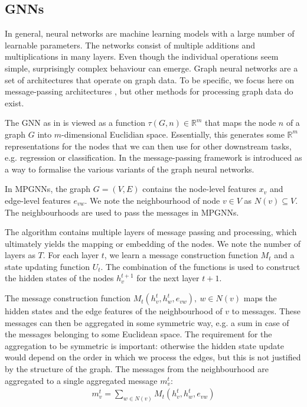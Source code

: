\documentclass[english, 12pt, a4paper, sci, utf8, a-2b, online]{aaltothesis}
\newcommand{\R}{\mathbb{R}}
\begin{document}
\subsection{GNNs}

In general, neural networks are machine learning models with a large number of learnable parameters. The networks consist of multiple additions and multiplications in many layers. Even though the individual operations seem simple, surprisingly complex behaviour can emerge. Graph neural networks are a set of architectures that operate on graph data. To be specific, we focus here on message-passing architectures \cite{mpgnn-into-2017}, but other methods for processing graph data do exist.

The GNN as in \cite{gnn-intro-2009} is viewed as a function $\tau(G, n) \in \R^m$ that maps the node $n$ of a graph $G$ into $m$-dimensional Euclidian space. Essentially, this generates some $\R^m$ representations for the nodes that we can then use for other downstream tasks, e.g. regression or classification. In \cite{mpgnn-into-2017} the message-passing framework is introduced as a way to formalise the various variants of the graph neural networks.

In MPGNNs, the graph $G = (V, E)$ contains the node-level features $x_v$ and edge-level features $e_{vw}$. We note the neighbourhood of node $v \in V$ as $N(v) \subseteq V$. The neighbourhoods are used to pass the messages in MPGNNs.

The algorithm contains multiple layers of message passing and processing, which ultimately yields the mapping or embedding of the nodes. We note the number of layers as $T$. For each layer $t$, we learn a message construction function $M_t$ and a state updating function $U_t$. The combination of the functions is used to construct the hidden states of the nodes $h_v^{t+1}$ for the next layer $t+1$.

The message construction function $M_t(h_v^t, h_w^t, e_{vw}),\ w \in N(v)$ maps the hidden states and the edge features of the neighbourhood of $v$ to messages. These messages can then be aggregated in some symmetric way, e.g. a sum in case of the messages belonging to some Euclidean space. The requirement for the aggregation to be symmetric is important: otherwise the hidden state update would depend on the order in which we process the edges, but this is not justified by the structure of the graph. The messages from the neighbourhood are aggregated to a single aggregated message $m_v^t$:
\begin{align}
    m_v^t = \sum_{w \in N(v)}M_t(h_v^t, h_w^t, e_{vw})
\end{align}
\end{document}
